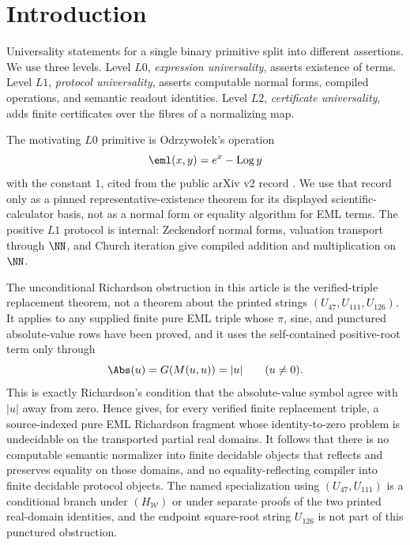 ﻿%
\section{Introduction}\label{sec:intro}

Universality statements for a single binary primitive split into different
assertions.  We use three levels.  Level \(L0\), \emph{expression universality},
asserts existence of terms.  Level \(L1\), \emph{protocol universality}, asserts
computable normal forms, compiled operations, and semantic readout identities.
Level \(L2\), \emph{certificate universality}, adds finite certificates over the
fibres of a normalizing map.

The motivating \(L0\) primitive is Odrzywo{\l}ek's operation
\[
  \eml(x,y)=e^x-\operatorname{Log}y
\]
with the constant \(1\), cited from the public arXiv v2 record
\cite{Odrzywolek2026SingleBinaryOperator}.  We use that record only as a pinned
representative-existence theorem for its displayed scientific-calculator basis,
not as a normal form or equality algorithm for EML terms.  The positive \(L1\)
protocol is internal: Zeckendorf normal forms, valuation transport through
\(\NN\), and Church iteration give compiled addition and multiplication on
\(\NN\).

The unconditional Richardson obstruction in this article is the verified-triple
replacement theorem, not a theorem about the printed strings
\((U_{47},U_{111},U_{126})\).  It applies to any supplied finite pure EML triple
whose \(\pi\), sine, and punctured absolute-value rows have been proved, and it
uses the self-contained positive-root term only through
\[
  \Abs(u)=G(M(u,u))=|u|\qquad(u\ne0).
\]
This is exactly Richardson's condition that the absolute-value symbol agree with
\(|u|\) away from zero.  Hence  gives, for every verified
finite replacement triple, a source-indexed pure EML Richardson fragment whose
identity-to-zero problem is undecidable on the transported partial real domains.
It follows that
there is no computable semantic normalizer into finite decidable objects that
reflects and preserves equality on those domains, and no equality-reflecting
compiler into finite decidable protocol objects.  The named specialization using
\((U_{47},U_{111})\) is a conditional branch under \((H_{\mathcal W})\) or under
separate proofs of the two printed real-domain identities, and the endpoint
square-root string \(U_{126}\) is not part of this punctured obstruction.

